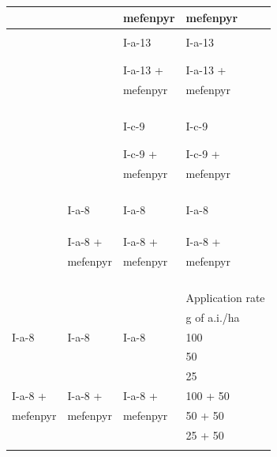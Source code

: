 \documentclass[11pt,a4paper]{article}
\begin{document}
\begin{table}[h]
\begin{tabular}{|l|l|l|l|}
 &  & mefenpyr & mefenpyr \\ \hline
 &  &  &  \\ \hline
 &  & I-a-13 & I-a-13 \\ \hline
 &  &  &  \\ \hline
 &  &  &  \\ \hline
 &  & I-a-13 + & I-a-13 + \\ \hline
 &  & mefenpyr & mefenpyr \\ \hline
 &  &  &  \\ \hline
 &  &  &  \\ \hline
 &  &  &  \\ \hline
 &  &  &  \\ \hline
 &  & I-c-9 & I-c-9 \\ \hline
 &  &  &  \\ \hline
 &  &  &  \\ \hline
 &  & I-c-9 + & I-c-9 + \\ \hline
 &  & mefenpyr & mefenpyr \\ \hline
 &  &  &  \\ \hline
 &  &  &  \\ \hline
 &  &  &  \\ \hline
 &  &  &  \\ \hline
 & I-a-8 & I-a-8 & I-a-8 \\ \hline
 &  &  &  \\ \hline
 &  &  &  \\ \hline
 &  &  &  \\ \hline
 & I-a-8 + & I-a-8 + & I-a-8 + \\ \hline
 & mefenpyr & mefenpyr & mefenpyr \\ \hline
 &  &  &  \\ \hline
 &  &  &  \\ \hline
 &  &  &  \\ \hline
 &  &  &  \\ \hline
 &  &  & Application rate \\ \hline
 &  &  & g of a.i./ha \\ \hline
I-a-8 & I-a-8 & I-a-8 & 100 \\ \hline
 &  &  & 50 \\ \hline
 &  &  & 25 \\ \hline
I-a-8 + & I-a-8 + & I-a-8 + & 100 + 50 \\ \hline
mefenpyr & mefenpyr & mefenpyr & 50 + 50 \\ \hline
 &  &  & 25 + 50 \\ \hline
 &  &  &  \\ \hline

\end{tabular}
\end{table}
\end{document}
